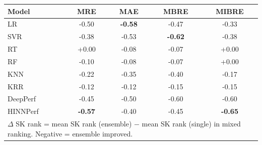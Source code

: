 \begin{tabular}{lcccc}
\toprule
Model & MRE & MAE & MBRE & MIBRE \\
\midrule
LR & -0.50 & \textbf{-0.58} & -0.47 & -0.33 \\
SVR & -0.38 & -0.53 & \textbf{-0.62} & -0.38 \\
RT & +0.00 & -0.08 & -0.07 & +0.00 \\
RF & -0.10 & -0.08 & -0.07 & +0.00 \\
KNN & -0.22 & -0.35 & -0.40 & -0.17 \\
KRR & -0.12 & -0.12 & -0.15 & -0.15 \\
DeepPerf & -0.45 & -0.50 & -0.60 & -0.60 \\
HINNPerf & \textbf{-0.57} & -0.40 & -0.45 & \textbf{-0.65} \\
\bottomrule
\multicolumn{5}{l}{\footnotesize $\Delta$ SK rank = mean SK rank (ensemble) $-$ mean SK rank (single) in mixed ranking. Negative = ensemble improved.} \\
\end{tabular}
